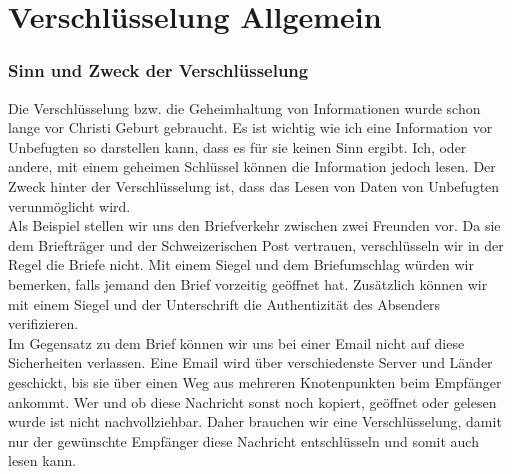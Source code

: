 \part{Verschlüsselung Allgemein}
\section{Sinn und Zweck der Verschlüsselung}
Die Verschlüsselung bzw. die Geheimhaltung von Informationen wurde schon lange vor Christi Geburt gebraucht. Es ist wichtig wie ich eine Information vor Unbefugten so darstellen kann, dass es für sie keinen Sinn ergibt. Ich, oder andere, mit einem geheimen Schlüssel können die Information jedoch lesen. Der Zweck hinter der Verschlüsselung ist, dass das Lesen von Daten von Unbefugten verunmöglicht wird. \\
Als Beispiel stellen wir uns den Briefverkehr zwischen zwei Freunden vor. Da sie dem Briefträger und der Schweizerischen Post vertrauen, verschlüsseln wir in der Regel die Briefe nicht. Mit einem Siegel und dem Briefumschlag würden wir bemerken, falls jemand den Brief vorzeitig geöffnet hat. Zusätzlich können wir mit einem Siegel und der Unterschrift die Authentizität des Absenders verifizieren.\\
Im Gegensatz zu dem Brief können wir uns bei einer Email nicht auf diese Sicherheiten verlassen. Eine Email wird über verschiedenste Server und Länder geschickt, bis sie über einen Weg aus mehreren Knotenpunkten beim Empfänger ankommt. Wer und ob diese Nachricht sonst noch kopiert, geöffnet oder gelesen wurde ist nicht nachvollziehbar. Daher brauchen wir eine Verschlüsselung, damit nur der gewünschte Empfänger diese Nachricht entschlüsseln und somit auch lesen kann.
%
%
